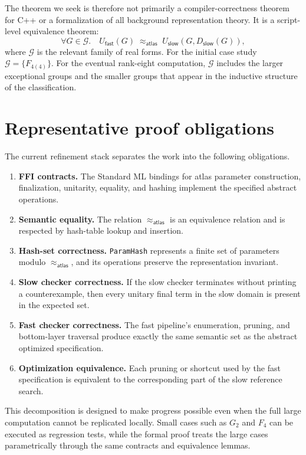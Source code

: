 \documentclass{easychair}
\def\atlas{\textsf{atlas}\xspace}
\def\sml{\textsf{Standard ML}\xspace}
\newcommand{\Ufast}{U_{\mathsf{fast}}}
\newcommand{\Uslow}{U_{\mathsf{slow}}}
\newcommand{\Dslow}{D_{\mathsf{slow}}}
\newcommand{\atlasEq}{\mathrel{\approx_{\atlas}}}
\begin{document}
The theorem we seek is therefore not primarily a compiler-correctness theorem
for C++ or a formalization of all background representation theory.  It is a
script-level equivalence theorem:
\[
\forall G\in \mathcal{G}.\quad
\Ufast(G)\;\atlasEq\;\Uslow(G,\Dslow(G)),
\]
where \(\mathcal{G}\) is the relevant family of real forms.  For the initial
case study \(\mathcal{G}=\{F_{4(4)}\}\).  For the eventual rank-eight computation,
\(\mathcal{G}\) includes the larger exceptional groups and the smaller groups
that appear in the inductive structure of the classification.

\section{Representative proof obligations}

The current refinement stack separates the work into the following obligations.

\begin{enumerate}
\item \textbf{FFI contracts.}  The \sml bindings for \atlas{} parameter
construction, finalization, unitarity, equality, and hashing implement the
specified abstract operations.
\item \textbf{Semantic equality.}  The relation \(\atlasEq\) is an equivalence
relation and is respected by hash-table lookup and insertion.
\item \textbf{Hash-set correctness.}  \texttt{ParamHash} represents a finite set
of parameters modulo \(\atlasEq\), and its operations preserve the
representation invariant.
\item \textbf{Slow checker correctness.}  If the slow checker terminates without
printing a counterexample, then every unitary final term in the slow domain is
present in the expected set.
\item \textbf{Fast checker correctness.}  The fast pipeline's enumeration,
pruning, and bottom-layer traversal produce exactly the same semantic set as the
abstract optimized specification.
\item \textbf{Optimization equivalence.}  Each pruning or shortcut used by the
fast specification is equivalent to the corresponding part of the slow
reference search.
\end{enumerate}

This decomposition is designed to make progress possible even when the full
large computation cannot be replicated locally.  Small cases such as \(G_2\) and
\(F_4\) can be executed as regression tests, while the formal proof treats the
large cases parametrically through the same contracts and equivalence lemmas.
\end{document}
